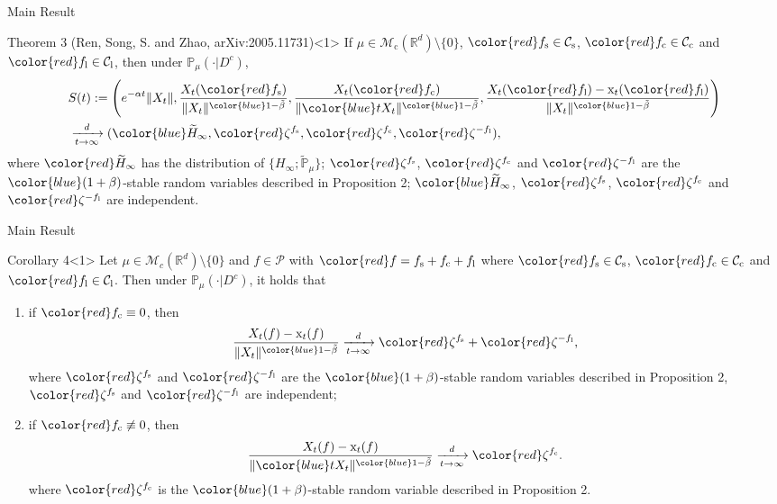\documentclass[xcolor=dvipsnames]{beamer}
\begin{document}
\begin{frame}{Main Result}

\begin{block}{Theorem 3 (Ren, Song, S. and Zhao, arXiv:2005.11731)}<1>
If $\mu\in \mathcal M_\mathrm c(\mathbb R^d)\setminus\{0\}$, $\color{red}f_\mathrm s\in \mathcal C_\mathrm s$, $\color{red}f_\mathrm c\in \mathcal C_\mathrm c$ and $\color{red}f_\mathrm l \in \mathcal C_\mathrm l$, then under $\mathbb P_\mu(\cdot | D^c)$,
	\begin{align*} 
	&S(t):=
	\Bigg(e^{-\alpha t}\|X_t\|, \frac{X_t({\color{red}f_\mathrm s})}{\|X_t\|^{{\color{blue}1-\tilde \beta}}},\frac{X_t({\color{red}f_\mathrm c)}}{\|{\color{blue}t}X_t\|^{{\color{blue}1-\tilde \beta}}}, \frac{ X_t({\color{red}f_\mathrm l}) - \mathrm x_t({\color{red}f_\mathrm l})}{\|X_t\|^{{\color{blue}1-\tilde \beta}}} \Bigg)
	\\&\xrightarrow[t\rightarrow \infty]{d}({\color{blue}\widetilde H_\infty},{\color{red}\zeta^{f_\mathrm s}},{\color{red}\zeta^{f_\mathrm c}},{\color{red}\zeta^{-f_\mathrm l}}),
	\end{align*}
	where 
${\color{red}\widetilde H_\infty}$ has the distribution of $\{H_{\infty}; \widetilde {\mathbb P}_\mu\}$; $\color{red}\zeta^{f_\mathrm s}$, $\color{red}\zeta^{f_\mathrm c}$ and $\color{red}\zeta^{-f_\mathrm l}$ are the $\color{blue}(1+\beta)$-stable random variables described in Proposition 2; $\color{blue}\widetilde H_\infty$,  $\color{red}\zeta^{f_\mathrm s}$, $\color{red}\zeta^{f_\mathrm c}$ and $\color{red}\zeta^{-f_\mathrm l}$ are independent.
\end{block}
\end{frame}

\begin{frame}{Main Result}
\begin{block}{Corollary 4}<1>
Let $\mu\in \mathcal M_c(\mathbb R^d)\setminus \{0\}$ and $f\in \mathcal P$ with $\color{red}f=f_\mathrm s + f_\mathrm c+ f_\mathrm l$ where $\color{red}f_\mathrm s \in \mathcal C_\mathrm s$, $\color{red}f_\mathrm c\in \mathcal C_\mathrm c$ and $\color{red}f_\mathrm l \in \mathcal C_\mathrm l$.
Then under $\mathbb{P}_{\mu}(\cdot| D^c)$, it holds that
\begin{enumerate}
\item  if $\color{red}f_\mathrm c\equiv 0$, then
\[
    \frac{ X_t(f) - \mathrm x_t(f)} {\|X_t\|^{{\color{blue}1-\tilde \beta}}}
    \xrightarrow[t\to \infty]{d}
       {\color{red}\zeta^{f_\mathrm s}}+{\color{red}\zeta^{-f_\mathrm l}},
\]
	where $\color{red}\zeta^{f_\mathrm s}$ and $\color{red}\zeta^{-f_\mathrm l}$  are the $\color{blue}(1+\beta)$-stable random variables described in Proposition 2, $\color{red}\zeta^{f_\mathrm s}$ and $\color{red}\zeta^{-f_\mathrm l}$ are independent;
\item if $\color{red}f_\mathrm c\not \equiv 0$, then
\[
    \frac{ X_t(f) - \mathrm x_t(f)}{\|{\color{blue}t}X_t\|^{{\color{blue}1-\tilde \beta}}}
    \xrightarrow[t\to \infty]{d}{\color{red}\zeta^{f_\mathrm c}}.
\]
	where $\color{red}\zeta^{f_\mathrm c}$ is the $\color{blue}(1+\beta)$-stable random variable described in Proposition 2.
\end{enumerate}
\end{block}
\end{frame}
\end{document}
